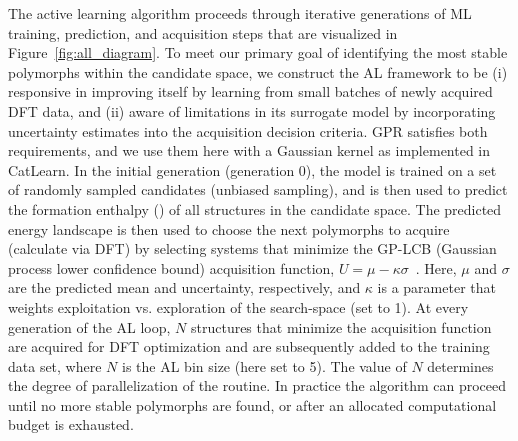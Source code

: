 %
%
The active learning algorithm proceeds through iterative generations of ML training, prediction, and acquisition steps that are visualized in Figure~\ref{fig:all_diagram}.
%
To meet our primary goal of identifying the most stable polymorphs within the candidate space,
we construct the AL framework to be
(i) responsive in improving itself by learning from small batches of newly acquired DFT data,
and (ii) aware of limitations in its surrogate model by incorporating uncertainty estimates into the acquisition decision criteria.
%
GPR satisfies both requirements,
and we use them here with a Gaussian kernel as implemented in CatLearn.
\cite{hansen2019atomistic,CatLearn_Repo}
%
%
In the initial generation (generation 0), the model is trained on a set of randomly sampled candidates (unbiased sampling),
and is then used to predict the formation enthalpy (\DHf) of all structures in the candidate space.
%
The predicted energy landscape is then used to choose the next polymorphs to acquire (calculate via DFT) by selecting systems that minimize the GP-LCB (Gaussian process lower confidence bound) acquisition function,
$U = \mu - \kappa \sigma$~\cite{Cox1992}.
%
Here, $\mu$ and $\sigma$ are the predicted \DHf mean and uncertainty, respectively,
and $\kappa$ is a parameter that weights exploitation vs. exploration of the search-space (set to 1).
%
At every generation of the AL loop, $N$ structures that minimize the acquisition function are acquired for DFT optimization and are subsequently added to the training data set, where $N$ is the AL bin size (here set to 5).
%
The value of $N$ determines the degree of parallelization of the routine.
%
%
%
In practice the algorithm can proceed until no more stable polymorphs are found, or after an allocated computational budget is exhausted.


